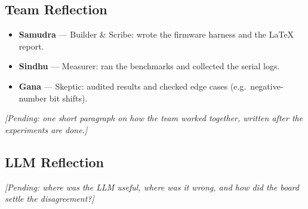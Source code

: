 \subsection{Team Reflection}
\begin{itemize}[noitemsep]
    \item \textbf{Samudra} --- Builder \& Scribe: wrote the firmware harness and the \LaTeX{} report.
    \item \textbf{Sindhu} --- Measurer: ran the benchmarks and collected the serial logs.
    \item \textbf{Gana} --- Skeptic: audited results and checked edge cases (e.g.\ negative-number bit shifts).
\end{itemize}
\textit{[Pending: one short paragraph on how the team worked together, written after the experiments are done.]}

\subsection{LLM Reflection}
\textit{[Pending: where was the LLM useful, where was it wrong, and how did the board settle the disagreement?]}
